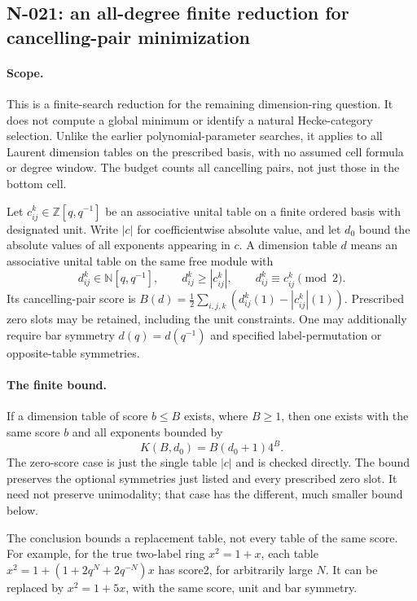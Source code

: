 \subsection{N-021: an all-degree finite reduction for cancelling-pair minimization}
\label{sec:dimension-degree-cutoff}

\paragraph{Scope.}
This is a finite-search reduction for the remaining dimension-ring
question.  It does not compute a global minimum or identify a natural
Hecke-category selection.  Unlike the earlier polynomial-parameter
searches, it applies to all Laurent dimension tables on the prescribed
basis, with no assumed cell formula or degree window.  The budget
counts all cancelling pairs, not just those in the bottom cell.

Let $c_{ij}^k\in\mathbb Z[q,q^{-1}]$ be an associative unital table
on a finite ordered basis with designated unit.  Write $|c|$ for
coefficientwise absolute value, and let $d_0$ bound the absolute
values of all exponents appearing in $c$.  A dimension table $d$
means an associative unital table on the same free module with
\[
 d_{ij}^k\in\mathbb N[q,q^{-1}],\qquad
 d_{ij}^k\ge |c_{ij}^k|,\qquad d_{ij}^k\equiv c_{ij}^k\pmod2.
 \tag{N-115}
\]
Its cancelling-pair score is
$B(d)=\frac12\sum_{i,j,k}(d_{ij}^k(1)-|c_{ij}^k|(1))$.
Prescribed zero slots may be retained, including the unit constraints.
One may additionally require bar symmetry $d(q)=d(q^{-1})$ and
specified label-permutation or opposite-table symmetries.

\paragraph{The finite bound.}
If a dimension table of score $b\le B$ exists, where $B\ge1$,
then one exists with the same score $b$ and all exponents bounded by
\[
                 K(B,d_0)=B(d_0+1)4^B.
 \tag{N-116}
\]
The zero-score case is just the single table $|c|$ and is checked
directly.  The bound preserves the optional symmetries just listed
and every prescribed zero slot.  It need not preserve unimodality;
that case has the different, much smaller bound below.

The conclusion bounds a replacement table, not every table of
the same score.  For example, for the true two-label ring
$x^2=1+x$, each table
$x^2=1+(1+2q^N+2q^{-N})x$ has score2, for arbitrarily large $N$.
It can be replaced by $x^2=1+5x$, with the same score, unit and
bar symmetry.

